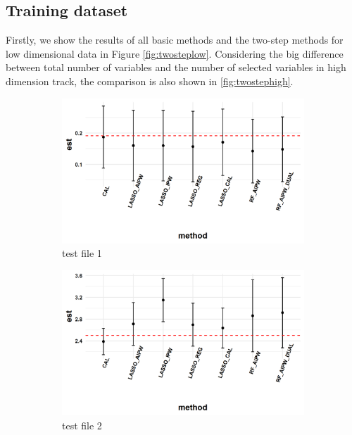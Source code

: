 \documentclass[11pt, oneside]{article}
\begin{document}
\subsection{Training dataset}
Firstly, we show the results of all basic methods and the two-step methods for low dimensional data in Figure \ref{fig:twosteplow}. Considering the big difference between total number of variables and the number of selected variables in high dimension track, the comparison is also shown in \ref{fig:twostephigh}.
\begin{figure}[h]
  \begin{subfigure}{0.24\textwidth}
    \includegraphics[width=\textwidth]{../plot/method_comparison_1.png}
    \caption{test file 1}
  \end{subfigure}
  \begin{subfigure}{0.24\textwidth}
    \includegraphics[width=\textwidth]{../plot/method_comparison_2.png}
    \caption{test file 2}
  \end{subfigure}
  \begin{subfigure}{0.24\textwidth}

\end{subfigure}
\end{figure}
\end{document}
